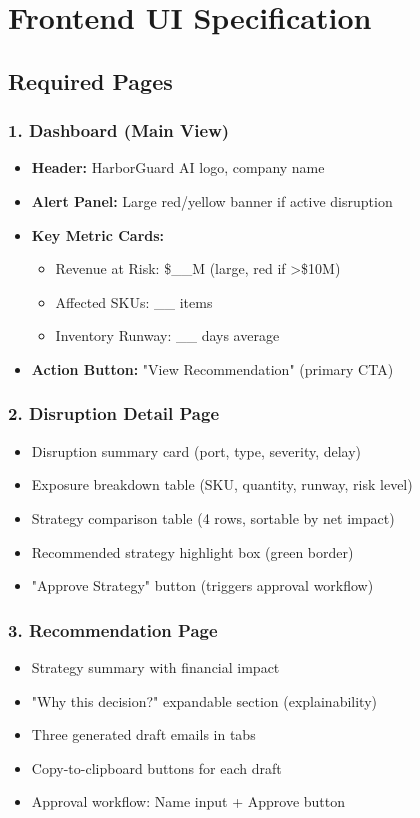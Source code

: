 \documentclass[11pt]{article}
\begin{document}
\section{Frontend UI Specification}

\subsection{Required Pages}

\subsubsection{1. Dashboard (Main View)}
\begin{itemize}
    \item \textbf{Header:} HarborGuard AI logo, company name
    \item \textbf{Alert Panel:} Large red/yellow banner if active disruption
    \item \textbf{Key Metric Cards:}
        \begin{itemize}
            \item Revenue at Risk: \$\_\_M (large, red if >\$10M)
            \item Affected SKUs: \_\_ items
            \item Inventory Runway: \_\_ days average
        \end{itemize}
    \item \textbf{Action Button:} "View Recommendation" (primary CTA)
\end{itemize}

\subsubsection{2. Disruption Detail Page}
\begin{itemize}
    \item Disruption summary card (port, type, severity, delay)
    \item Exposure breakdown table (SKU, quantity, runway, risk level)
    \item Strategy comparison table (4 rows, sortable by net impact)
    \item Recommended strategy highlight box (green border)
    \item "Approve Strategy" button (triggers approval workflow)
\end{itemize}

\subsubsection{3. Recommendation Page}
\begin{itemize}
    \item Strategy summary with financial impact
    \item "Why this decision?" expandable section (explainability)
    \item Three generated draft emails in tabs
    \item Copy-to-clipboard buttons for each draft
    \item Approval workflow: Name input + Approve button
\end{itemize}
\end{document}
